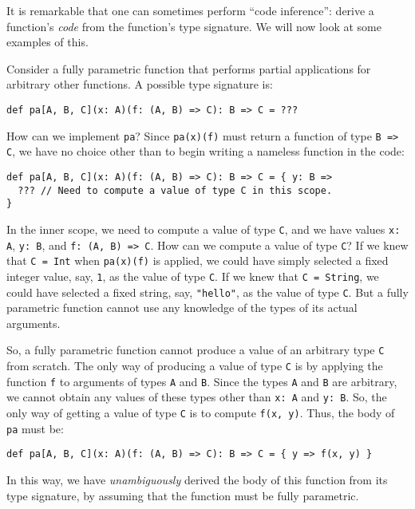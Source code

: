 It is remarkable that one can sometimes perform \textsf{``}code
inference\textsf{''}: derive a function\textsf{'}s \emph{code} from the function\textsf{'}s
type signature. We will now look at some examples of this.

Consider a fully parametric function that performs partial applications
for arbitrary other functions. A possible type signature is:
\begin{lstlisting}
def pa[A, B, C](x: A)(f: (A, B) => C): B => C = ???
\end{lstlisting}

How can we implement \lstinline!pa!? Since \lstinline!pa(x)(f)!
must return a function of type \lstinline!B => C!, we have no choice
other than to begin writing a nameless function in the code:
\begin{lstlisting}
def pa[A, B, C](x: A)(f: (A, B) => C): B => C = { y: B =>
  ??? // Need to compute a value of type C in this scope.
}
\end{lstlisting}
In the inner scope, we need to compute a value of type \lstinline!C!,
and we have values \lstinline!x: A!, \lstinline!y: B!, and \lstinline!f: (A, B) => C!.
How can we compute a value of type \lstinline!C!? If we knew that
\lstinline!C = Int! when \lstinline!pa(x)(f)! is applied, we could
have simply selected a fixed integer value, say, \lstinline!1!, as
the value of type \lstinline!C!. If we knew that \lstinline!C = String!,
we could have selected a fixed string, say, \lstinline!"hello"!,
as the value of type \lstinline!C!. But a fully parametric function
cannot use any knowledge of the types of its actual arguments.

So, a fully parametric function cannot produce a value of an arbitrary
type \lstinline!C! from scratch. The only way of producing a value
of type \lstinline!C! is by applying the function \lstinline!f!
to arguments of types \lstinline!A! and \lstinline!B!. Since the
types \lstinline!A! and \lstinline!B! are arbitrary, we cannot obtain
any values of these types other than \lstinline!x: A! and \lstinline!y: B!.
So, the only way of getting a value of type \lstinline!C! is to compute
\lstinline!f(x, y)!. Thus, the body of \lstinline!pa! must be:
\begin{lstlisting}
def pa[A, B, C](x: A)(f: (A, B) => C): B => C = { y => f(x, y) }
\end{lstlisting}
In this way, we have \emph{unambiguously} derived the body of this
function from its type signature, by assuming that the function must
be fully parametric.

